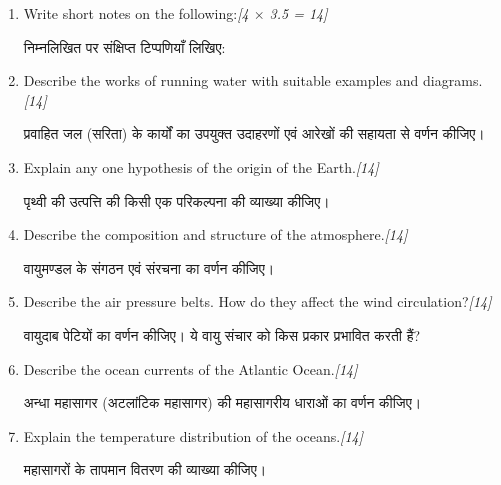 \documentclass[11pt,a4paper]{article}
\newcommand{\pts}[1]{\hfill \textit{[#1]}}
\begin{document}
\begin{enumerate}[label=\textbf{\arabic*.},leftmargin=*,itemsep=14pt]

  \item Write short notes on the following:\pts{4 $\times$ 3.5 = 14}
  
  निम्नलिखित पर संक्षिप्त टिप्पणियाँ लिखिए:

  \item Describe the works of running water with suitable examples and diagrams.\pts{14}
  
  प्रवाहित जल (सरिता) के कार्यों का उपयुक्त उदाहरणों एवं आरेखों की सहायता से वर्णन कीजिए।

  \item Explain any one hypothesis of the origin of the Earth.\pts{14}
  
  पृथ्वी की उत्पत्ति की किसी एक परिकल्पना की व्याख्या कीजिए।

  \item Describe the composition and structure of the atmosphere.\pts{14}
  
  वायुमण्डल के संगठन एवं संरचना का वर्णन कीजिए।

  \item Describe the air pressure belts. How do they affect the wind circulation?\pts{14}
  
  वायुदाब पेटियों का वर्णन कीजिए। ये वायु संचार को किस प्रकार प्रभावित करती हैं?

  \item Describe the ocean currents of the Atlantic Ocean.\pts{14}
  
  अन्धा महासागर (अटलांटिक महासागर) की महासागरीय धाराओं का वर्णन कीजिए।

  \item Explain the temperature distribution of the oceans.\pts{14}
  
  महासागरों के तापमान वितरण की व्याख्या कीजिए।

\end{enumerate}
\end{document}
